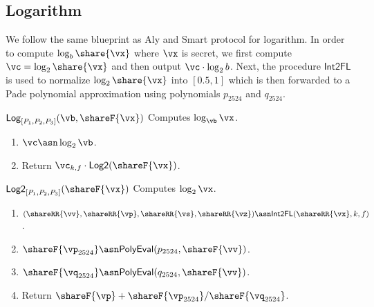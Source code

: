 \subsection{Logarithm}
\label{subsec:logarithm}

We follow the same blueprint as Aly and Smart protocol for logarithm. In order
to compute $\log_b{\share{\vx}}$ where $\vx$ is secret, we first compute $\vc =
\log_2{\share{\vx}}$ and then output $\vc \cdot \log_2{b}$. Next, the procedure
$\mathsf{Int2FL}$ is used to normalize $\log_2{\share{\vx}}$ into $[0.5, 1]$
which is then forwarded to a Pade polynomial approximation using polynomials
$p_{2524}$ and $q_{2524}$.

\msubsubsection
  {$\mathsf{Log}_{[P_1, P_2, P_3]}(\vb, \shareF{\vx})$}
  Computes $\log_{\vb}{\vx}$.
\begin{enumerate}
    \item $\vc \asn \log_2{\vb}$.
    \item Return $\vc_{k, f} \cdot \mathsf{Log2}(\shareF{\vx})$.
\end{enumerate}

\msubsubsection
  {$\mathsf{Log2}_{[P_1, P_2, P_3]}(\shareF{\vx})$}
  Computes $\log_2{\vx}$.
\begin{enumerate}
    \item $(\shareRR{\vv}, \shareRR{\vp}, \shareRR{\vs}, \shareRR{\vz}) \asn \mathsf{Int2FL}(\shareRR{\vx}, k, f)$.
    \item $\shareF{\vp_{2524}} \asn \mathsf{PolyEval}(p_{2524}, \shareF{\vv})$.
    \item $\shareF{\vq_{2524}} \asn \mathsf{PolyEval}(q_{2524}, \shareF{\vv})$.
    \item Return $\shareF{\vp} + \shareF{\vp_{2524}} / \shareF{\vq_{2524}}$.
\end{enumerate}




